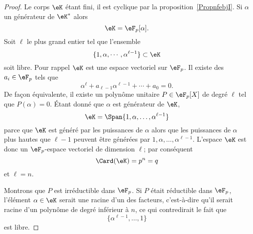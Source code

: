 \begin{proof}
    Le corps \( \eK\) étant fini, il est cyclique par la proposition~\ref{PropnfebjI}. Si \( \alpha\) un générateur de \( \eK^*\) alors
    \begin{equation}
        \eK=\eF_p[\alpha].
    \end{equation}
    Soit \( \ell\) le plus grand entier tel que l'ensemble
    \begin{equation}
        \{ 1,\alpha,\cdots,\alpha^{\ell-1} \}\subset\eK
    \end{equation}
    soit libre. Pour rappel \( \eK\) est une espace vectoriel sur \( \eF_p\). Il existe des \( a_i\in \eF_p\) tels que
    \begin{equation}
        \alpha^{\ell}+a_{\ell-1}\alpha^{\ell-1}+\cdots+a_0=0.
    \end{equation}
    De façon équivalente, il existe un polynôme unitaire \( P\in\eF_p[X]\) de degré \( \ell\) tel que \( P(\alpha)=0\). Étant donné que \( \alpha\) est générateur de \( \eK\),
    \begin{equation}
        \eK=\Span\{ 1,\alpha,\ldots, \alpha^{\ell-1} \}
    \end{equation}
    parce que \( \eK\) est généré par les puissances de \( \alpha\) alors que les puissances de \( \alpha\) plus hautes que \( \ell-1\) peuvent être générées par \( 1,\alpha,\ldots, \alpha^{\ell-1}\). L'espace \( \eK\) est donc un \( \eF_p\)-espace vectoriel de dimension \( \ell\); par conséquent
    \begin{equation}
        \Card(\eK)=p^n=q
    \end{equation}
    et \( \ell=n\).

    Montrons que \( P\) est irréductible dans \( \eF_p\). Si \( P\) était réductible dans \( \eF_p\), l'élément \( \alpha\in \eK\) serait une racine d'un des facteurs, c'est-à-dire qu'il serait racine d'un polynôme de degré inférieur à \( n\), ce qui contredirait le fait que
    \begin{equation}
        \{ \alpha^{\ell-1},\ldots, 1 \}
    \end{equation}
    est libre.


\end{proof}
